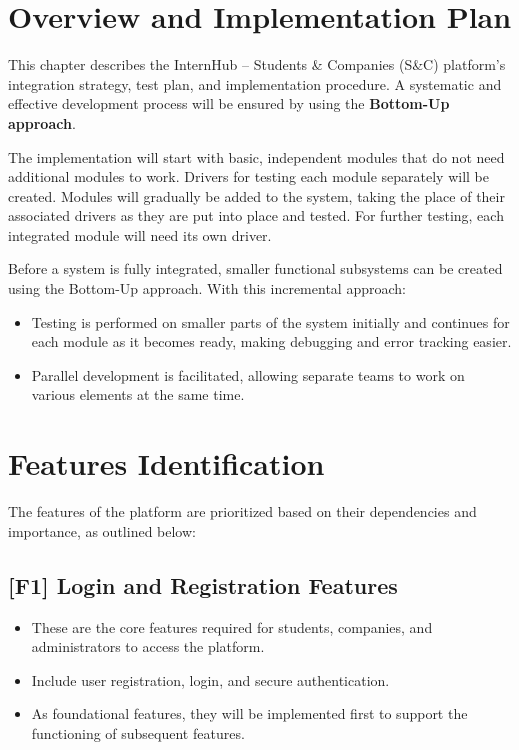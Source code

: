 \section{Overview and Implementation Plan}
\label{sec:overview_implementation}

This chapter describes the InternHub – Students \& Companies (S\&C) platform's integration strategy, test plan, and implementation procedure. A systematic and effective development process will be ensured by using the \textbf{Bottom-Up approach}.

The implementation will start with basic, independent modules that do not need additional modules to work. Drivers for testing each module separately will be created. Modules will gradually be added to the system, taking the place of their associated drivers as they are put into place and tested. For further testing, each integrated module will need its own driver.

Before a system is fully integrated, smaller functional subsystems can be created using the Bottom-Up approach. With this incremental approach:
\begin{itemize}
    \item Testing is performed on smaller parts of the system initially and continues for each module as it becomes ready, making debugging and error tracking easier.
    \item Parallel development is facilitated, allowing separate teams to work on various elements at the same time.
\end{itemize}

\section{Features Identification}
\label{sec:features_identification}

The features of the platform are prioritized based on their dependencies and importance, as outlined below:

\subsection{[F1] Login and Registration Features}
\begin{itemize}
    \item These are the core features required for students, companies, and administrators to access the platform.
    \item Include user registration, login, and secure authentication.
    \item As foundational features, they will be implemented first to support the functioning of subsequent features.
\end{itemize}

